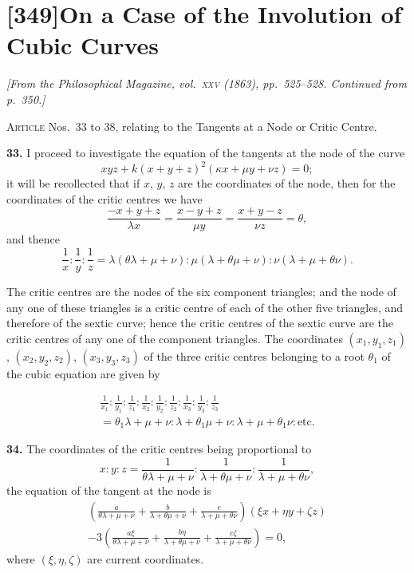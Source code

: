 \documentclass[11pt,a4paper]{article}
\theoremstyle{plain}
\theoremstyle{definition}
\begin{document}
\section*{[349]\quad On a Case of the Involution of Cubic Curves}

\noindent\textit{[From the \textit{Philosophical Magazine}, vol.~\textsc{xxv} (1863), pp.~525--528.  Continued from p.~350.]}

\bigskip

\noindent\textsc{Article} Nos.~33 to 38, relating to the Tangents at a Node or Critic Centre.

\medskip

\noindent\textbf{33.} I proceed to investigate the equation of the tangents at the node of the curve
\[
xyz + k(x + y + z)^2(\kappa x + \mu y + \nu z) = 0;
\]
it will be recollected that if $x$, $y$, $z$ are the coordinates of the node, then for the coordinates of the critic centres we have
\[
\frac{-x+y+z}{\lambda x} = \frac{x-y+z}{\mu y} = \frac{x+y-z}{\nu z} = \theta,
\]
and thence
\[
\frac{1}{x} : \frac{1}{y} : \frac{1}{z}
= \lambda(\theta\lambda + \mu + \nu)
: \mu(\lambda + \theta\mu + \nu)
: \nu(\lambda + \mu + \theta\nu).
\]

The critic centres are the nodes of the six component triangles; and the node of any one of these triangles is a critic centre of each of the other five triangles, and therefore of the sextic curve; hence the critic centres of the sextic curve are the critic centres of any one of the component triangles. The coordinates $(x_1, y_1, z_1)$, $(x_2, y_2, z_2)$, $(x_3, y_3, z_3)$ of the three critic centres belonging to a root $\theta_1$ of the cubic equation are given by

\begin{multline*}
\frac{1}{x_1} : \frac{1}{y_1} : \frac{1}{z_1}
: \frac{1}{x_2} : \frac{1}{y_2} : \frac{1}{z_2}
: \frac{1}{x_3} : \frac{1}{y_3} : \frac{1}{z_3} \\
= \theta_1\lambda + \mu + \nu
: \lambda + \theta_1\mu + \nu
: \lambda + \mu + \theta_1\nu
: \text{etc.}
\end{multline*}

\textbf{34.} The coordinates of the critic centres being proportional to
\[
x : y : z = \frac{1}{\theta\lambda + \mu + \nu} : \frac{1}{\lambda + \theta\mu + \nu} : \frac{1}{\lambda + \mu + \theta\nu},
\]
the equation of the tangent at the node is
\begin{gather*}
\left(\frac{a}{\theta\lambda + \mu + \nu} + \frac{b}{\lambda + \theta\mu + \nu} + \frac{c}{\lambda + \mu + \theta\nu}\right)(\xi x + \eta y + \zeta z) \\
- 3\left(\frac{a\xi}{\theta\lambda + \mu + \nu} + \frac{b\eta}{\lambda + \theta\mu + \nu} + \frac{c\zeta}{\lambda + \mu + \theta\nu}\right) = 0,
\end{gather*}
where $(\xi, \eta, \zeta)$ are current coordinates.
\end{document}

